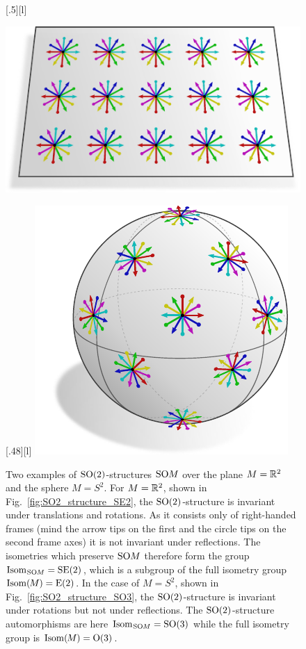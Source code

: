 \begin{figure}
    \centering
        [.5\linewidth][l]{
            \includegraphics[width=.5\textwidth]{figures/SO2_structure_SE2.pdf}
            \rule{0pt}{20pt}
        }
        [.48\linewidth][l]{
            \includegraphics[width=.4\textwidth]{figures/SO2_structure_SO3.pdf}
        }
    \caption[]{\small
        Two examples of $\operatorname{SO}(2)$-structures $\operatorname{SO}\mkern-3.6muM$ over the plane $M = \mathbb{R}^2$ and the sphere $M = S^2$.
        For ${M = \mathbb{R}^2}$, shown in Fig.~\ref{fig:SO2_structure_SE2}, the $\operatorname{SO}(2)$-structure is invariant under translations and rotations.
        As it consists only of right-handed frames (mind the arrow tips on the first and the circle tips on the second frame axes) it is not invariant under reflections.
        The isometries which preserve $\operatorname{SO}\mkern-3.6muM$ therefore form the group $\operatorname{Isom}_{\mkern1mu\operatorname{SO}\mkern-3.6muM} = \operatorname{SE}(2)$, which is a subgroup of the full isometry group $\operatorname{Isom}(\mkern-1.5mu M \mkern-.5mu) = \operatorname{E}(2)$.
        In the case of $M = S^2$, shown in Fig.~\ref{fig:SO2_structure_SO3}, the $\operatorname{SO}(2)$-structure is invariant under rotations but not under reflections.
        The $\operatorname{SO}(2)$-structure automorphisms are here $\operatorname{Isom}_{\mkern1mu\operatorname{SO}\mkern-3.6muM} = \operatorname{SO}(3)$ while the full isometry group is $\operatorname{Isom}(\mkern-1.5mu M \mkern-.5mu) = \operatorname{O}(3)$.
        }
    \label{fig:SO2_structures_SE2_SO3}
\end{figure}















